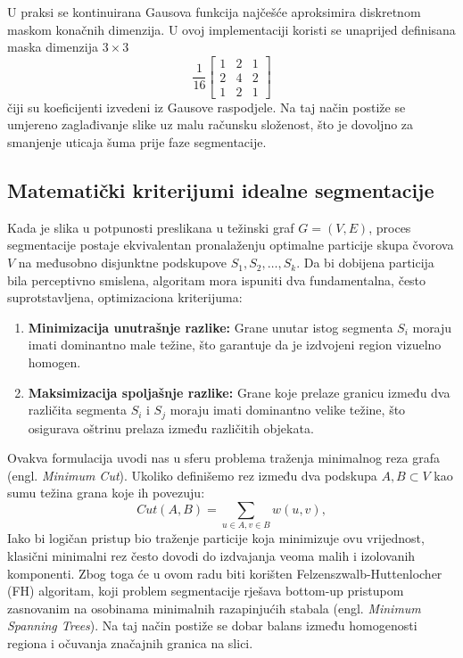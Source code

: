 \documentclass[11pt,a4paper]{article}
\begin{document}
U praksi se kontinuirana Gausova funkcija najčešće aproksimira diskretnom maskom konačnih dimenzija. U ovoj implementaciji koristi se unaprijed definisana maska dimenzija $3 \times 3$
\begin{equation}
\label{eq:gaussian_kernel}
\frac{1}{16}
\begin{bmatrix}
1 & 2 & 1\\
2 & 4 & 2\\
1 & 2 & 1
\end{bmatrix}
\end{equation}
čiji su koeficijenti izvedeni iz Gausove raspodjele. Na taj način postiže se umjereno zaglađivanje slike uz malu računsku složenost, što je dovoljno za smanjenje uticaja šuma prije faze segmentacije.


\subsection{Matematički kriterijumi idealne segmentacije}
Kada je slika u potpunosti preslikana u težinski graf $G = (V, E)$, proces segmentacije postaje ekvivalentan pronalaženju optimalne particije skupa čvorova $V$ na međusobno disjunktne podskupove $S_1, S_2, \dots, S_k$. Da bi dobijena particija bila perceptivno smislena, algoritam mora ispuniti dva fundamentalna, često suprotstavljena, optimizaciona kriterijuma:
\begin{enumerate}
    \item \textbf{Minimizacija unutrašnje razlike:} Grane unutar istog segmenta $S_i$ moraju imati dominantno male težine, što garantuje da je izdvojeni region vizuelno homogen.
    \item \textbf{Maksimizacija spoljašnje razlike:} Grane koje prelaze granicu između dva različita segmenta $S_i$ i $S_j$ moraju imati dominantno velike težine, što osigurava oštrinu prelaza između različitih objekata.
\end{enumerate}

Ovakva formulacija uvodi nas u sferu problema traženja minimalnog reza grafa (engl. \textit{Minimum Cut}). Ukoliko definišemo rez između dva podskupa $A, B \subset V$ kao sumu težina grana koje ih povezuju:
\begin{equation}
    Cut(A, B) = \sum_{u \in A, v \in B} w(u, v),
\end{equation}
Iako bi logičan pristup bio traženje particije koja minimizuje ovu vrijednost, klasični minimalni rez često dovodi do izdvajanja veoma malih i izolovanih komponenti. Zbog toga će u ovom radu biti korišten Felzenszwalb-Huttenlocher (FH) algoritam, koji problem segmentacije rješava bottom-up pristupom zasnovanim na osobinama minimalnih razapinjućih stabala (engl. \textit{Minimum Spanning Trees}). Na taj način postiže se dobar balans između homogenosti regiona i očuvanja značajnih granica na slici.
\end{document}
